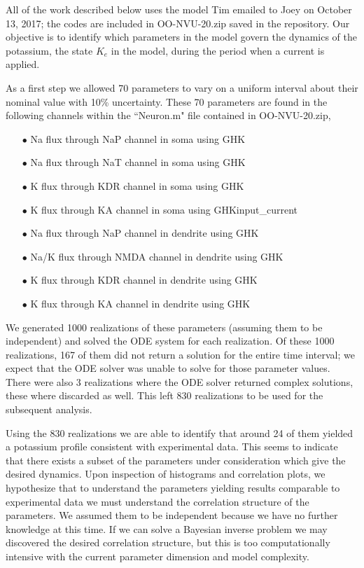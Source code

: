 \documentclass{article}
\begin{document}
All of the work described below uses the model Tim emailed to Joey on October 13, 2017; the codes are included in OO-NVU-20.zip saved in the repository. Our objective is to identify which parameters in the model govern the dynamics of the potassium, the state $K_e$ in the model, during the period when a current is applied.

As a first step we allowed 70 parameters to vary on a uniform interval about their nominal value with 10\% uncertainty. These 70 parameters are found in the following channels within the ``Neuron.m" file contained in OO-NVU-20.zip,
\begin{enumerate}
\item[$\bullet$] Na flux through NaP channel in soma using GHK
\item[$\bullet$] Na flux through NaT channel in soma using GHK
\item[$\bullet$] K flux through KDR channel in soma using GHK
\item[$\bullet$] K flux through KA channel in soma using GHKinput\_current
\item[$\bullet$] Na flux through NaP channel in dendrite using GHK
\item[$\bullet$] Na/K flux through NMDA channel in dendrite using GHK
\item[$\bullet$] K flux through KDR channel in dendrite using GHK
\item[$\bullet$] K flux through KA channel in dendrite using GHK
\end{enumerate}

We generated 1000 realizations of these parameters (assuming them to be independent) and solved the ODE system for each realization. Of these 1000 realizations, 167 of them did not return a solution for the entire time interval; we expect that the ODE solver was unable to solve for those parameter values. There were also 3 realizations where the ODE solver returned complex solutions, these where discarded as well. This left 830 realizations to be used for the subsequent analysis.

Using the 830 realizations we are able to identify that around 24 of them yielded a potassium profile consistent with experimental data. This seems to indicate that there exists a subset of the parameters under consideration which give the desired dynamics. Upon inspection of histograms and correlation plots, we hypothesize that to understand the parameters yielding results comparable to experimental data we must understand the correlation structure of the parameters. We assumed them to be independent because we have no further knowledge at this time. If we can solve a Bayesian inverse problem we may discovered the desired correlation structure, but this is too computationally intensive with the current parameter dimension and model complexity. 
\end{document}
